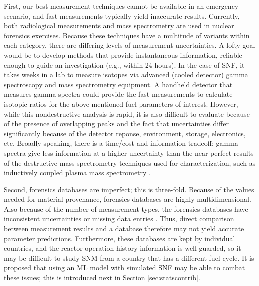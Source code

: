 First, our best measurement techniques cannot be available in an emergency
scenario, and fast measurements typically yield inaccurate results.  Currently,
both radiological measurements and mass spectrometry are used in nuclear
forensics exercises.  Because these techniques have a multitude of variants
within each category, there are differing levels of measurement uncertainties.
A lofty goal would be to develop methods that provide instantaneous
information, reliable enough to guide an investigation (e.g., within 24 hours).
In the case of \gls{SNF}, it takes weeks in a lab to measure isotopes via
advanced (cooled detector) gamma spectroscopy and mass spectrometry equipment.
A handheld detector that measures gamma spectra could provide the fast
measurements to calculate isotopic ratios for the above-mentioned fuel
parameters of interest.  However, while this nondestructive analysis is rapid,
it is also difficult to evaluate because of the presence of overlapping peaks
and the fact that uncertainties differ significantly because of the detector
reponse, environment, storage, electronics, etc. Broadly speaking, there is a
time/cost and information tradeoff: gamma spectra give less information at a
higher uncertainty than the near-perfect results of the destructive mass
spectrometry techniques used for characterization, such as inductively coupled
plasma mass spectrometry \cite{iaea_nf}.

Second, forensics databases are imperfect; this is three-fold.  Because of the
values needed for material provenance, forensics databases are highly
multidimensional. Also because of the number of measurement types, the
forensics databases have inconsistent uncertainties or missing data entries
\cite{nf_missingdata}.  Thus, direct comparison between measurement results and
a database therefore may not yield accurate parameter predictions.
Furthermore, these databases are kept by individual countries, and the reactor
operation history information is well-guarded, so it may be difficult to study
\gls{SNM} from a country that has a different fuel cycle.  It is proposed that
using an \gls{ML} model with simulated \gls{SNF} may be able to combat
these issues; this is introduced next in Section \ref{sec:statscontrib}. 
